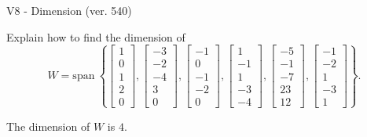 \begin{exercise}
  \begin{exerciseTitle}V8 - Dimension (ver. 540)\end{exerciseTitle}
  \begin{exerciseStatement}
    Explain how to find the dimension of 
\[W=\mathrm{span}\ \left\{\left[\begin{array}{r}
1 \\
0 \\
1 \\
2 \\
0
\end{array}\right] , \left[\begin{array}{r}
-3 \\
-2 \\
-4 \\
3 \\
0
\end{array}\right] , \left[\begin{array}{r}
-1 \\
0 \\
-1 \\
-2 \\
0
\end{array}\right] , \left[\begin{array}{r}
1 \\
-1 \\
1 \\
-3 \\
-4
\end{array}\right] , \left[\begin{array}{r}
-5 \\
-1 \\
-7 \\
23 \\
12
\end{array}\right] , \left[\begin{array}{r}
-1 \\
-2 \\
1 \\
-3 \\
1
\end{array}\right]\right\}.\]



  \end{exerciseStatement}
  \begin{exerciseAnswer}
   The dimension of \(W\) is  \(4\).
  


  \end{exerciseAnswer}
\end{exercise}